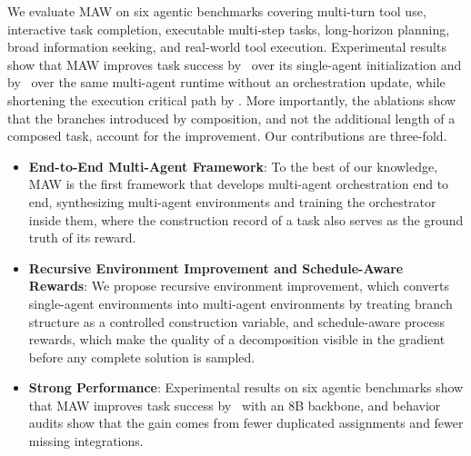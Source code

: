 We evaluate MAW on six agentic benchmarks covering multi-turn tool use, interactive task completion, executable multi-step tasks, long-horizon planning, broad information seeking, and real-world tool execution.
Experimental results show that MAW improves task success by \fillin\ over its single-agent initialization and by \fillin\ over the same multi-agent runtime without an orchestration update, while shortening the execution critical path by \fillin.
More importantly, the ablations show that the branches introduced by composition, and not the additional length of a composed task, account for the improvement.
Our contributions are three-fold.
\begin{itemize}[leftmargin=1em, itemsep=-1ex, topsep=0ex]
  \item \textbf{End-to-End Multi-Agent Framework}: To the best of our knowledge, MAW is the first framework that develops multi-agent orchestration end to end, synthesizing multi-agent environments and training the orchestrator inside them, where the construction record of a task also serves as the ground truth of its reward.
  \item \textbf{Recursive Environment Improvement and Schedule-Aware Rewards}: We propose recursive environment improvement, which converts single-agent environments into multi-agent environments by treating branch structure as a controlled construction variable, and schedule-aware process rewards, which make the quality of a decomposition visible in the gradient before any complete solution is sampled.
  \item \textbf{Strong Performance}: Experimental results on six agentic benchmarks show that MAW improves task success by \fillin\ with an 8B backbone, and behavior audits show that the gain comes from fewer duplicated assignments and fewer missing integrations.
\end{itemize}

